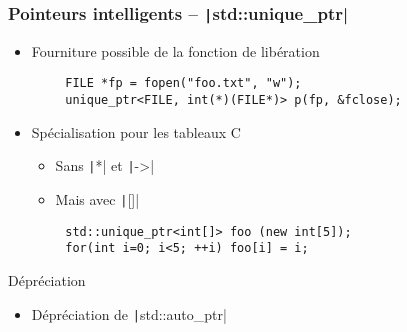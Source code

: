\documentclass[C++.tex]{subfiles}
\begin{document}
\begin{frame}[fragile]
	\frametitle{Pointeurs intelligents -- \texttt|std::unique_ptr|}
	\begin{itemize}
		\item Fourniture possible de la fonction de libération
	\end{itemize}

	\begin{verbatim}
		FILE *fp = fopen("foo.txt", "w");
		unique_ptr<FILE, int(*)(FILE*)> p(fp, &fclose);
	\end{verbatim}

	\begin{itemize}
		\item Spécialisation pour les tableaux C
		\begin{itemize}
			\item Sans \texttt|*| et \texttt|->|
			\item Mais avec \texttt|[]|
		\end{itemize}
	\end{itemize}

	\begin{verbatim}
		std::unique_ptr<int[]> foo (new int[5]);
		for(int i=0; i<5; ++i) foo[i] = i;
	\end{verbatim}

	\begin{block}{Dépréciation}
		\begin{itemize}
			\item Dépréciation de \texttt|std::auto_ptr|
		\end{itemize}
	\end{block}
\end{frame}
\end{document}
